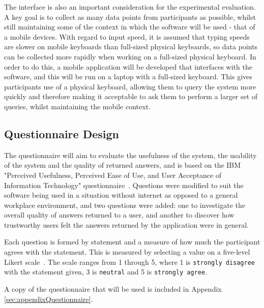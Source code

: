 \documentclass[authoryearcitations]{UoYCSproject}
\begin{document}
The interface is also an important consideration for the experimental evaluation. A key goal is to collect as many data points from participants as possible, whilst still maintaining some of the context in which the software will be used - that of a mobile devices. With regard to input speed, it is assumed that typing speeds are slower on mobile keyboards than full-sized physical keyboards, so data points can be collected more rapidly when working on a full-sized physical keyboard. In order to do this, a mobile application will be developed that interfaces with the software, and this will be run on a laptop with a full-sized keyboard. This gives participants use of a physical keyboard, allowing them to query the system more quickly and therefore making it acceptable to ask them to perform a larger set of queries, whilst maintaining the mobile context.

\subsection{Questionnaire Design}
\label{subsec:questionnaire}
The questionnaire will aim to evaluate the usefulness of the system, the usability of the system and the quality of returned answers, and is based on the IBM "Perceived Usefulness, Perceived Ease of Use, and User Acceptance of Information Technology" questionnaire~\cite{davis1989perceived}.  Questions were modified to suit the software being used in a situation without internet as opposed to a general workplace environment, and two questions were added: one to investigate the overall quality of answers returned to a user, and another to discover how trustworthy users felt the answers returned by the application were in general. 

Each question is formed by statement and a measure of how much the participant agrees with the statement. This is measured by selecting a value on a five-level Likert scale~\cite{likertScale}. The scale ranges from 1 through 5, where 1 is \texttt{strongly disagree} with the statement given, 3 is \texttt{neutral} and 5 is \texttt{strongly agree}.

A copy of the questionnaire that will be used is included in Appendix \ref{sec:appendixQuestionnaire}.
\end{document}
